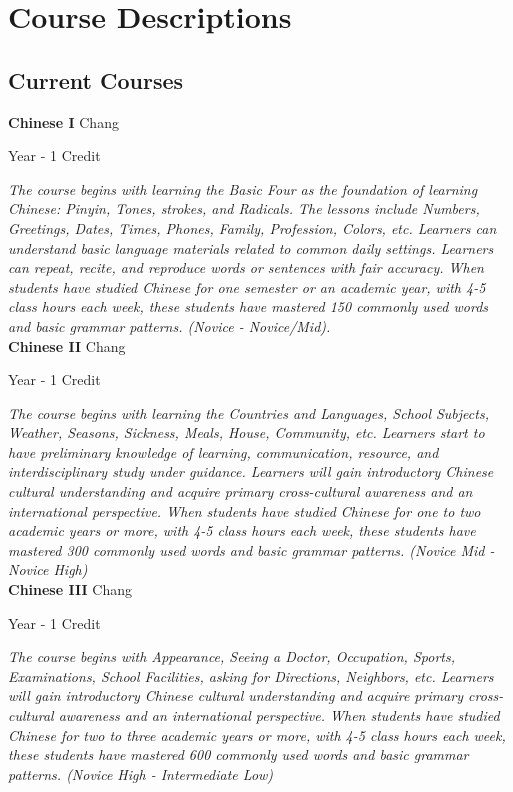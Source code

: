 \section{Course Descriptions}

\subsection{Current Courses}
\noindent\textbf{Chinese I} \hfill Chang

\noindent Year - 1 Credit

\vspace{1mm}\emph{The course begins with learning the Basic Four as the foundation of learning Chinese: Pinyin, Tones, strokes, and Radicals. The lessons include Numbers, Greetings, Dates, Times, Phones, Family, Profession, Colors, etc. Learners can understand basic language materials related to common daily settings. Learners can repeat, recite, and reproduce words or sentences with fair accuracy. When students have studied Chinese for one semester or an academic year, with 4-5 class hours each week, these students have mastered 150 commonly used words and basic grammar patterns. (Novice - Novice/Mid).}\\

\noindent\textbf{Chinese II} \hfill Chang

\noindent Year - 1 Credit

\vspace{1mm}\emph{The course begins with learning the Countries and Languages, School Subjects, Weather, Seasons, Sickness, Meals, House, Community, etc. Learners start to have preliminary knowledge of learning, communication, resource, and interdisciplinary study under guidance.  Learners will gain introductory Chinese cultural understanding and acquire primary cross-cultural awareness and an international perspective. When students have studied Chinese for one to two academic years or more, with 4-5 class hours each week, these students have mastered 300 commonly used words and basic grammar patterns. (Novice Mid - Novice High)}\\

\noindent\textbf{Chinese III} \hfill Chang

\noindent Year - 1 Credit

\vspace{1mm}\emph{The course begins with Appearance, Seeing a Doctor, Occupation, Sports, Examinations, School Facilities, asking for Directions, Neighbors, etc. Learners will gain introductory Chinese cultural understanding and acquire primary cross-cultural awareness and an international perspective. When students have studied Chinese for two to three academic years or more, with 4-5 class hours each week, these students have mastered 600 commonly used words and basic grammar patterns. (Novice High - Intermediate Low)}\\

